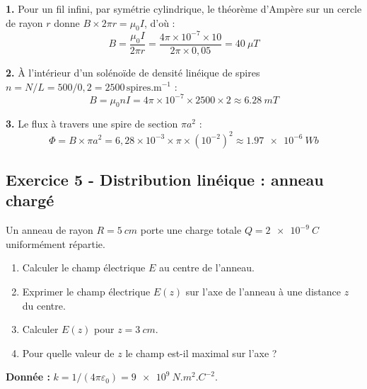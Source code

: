 \documentclass[12pt,a4paper]{article}
\begin{document}
\begin{boitecorrige}
\textbf{1.} Pour un fil infini, par symétrie cylindrique, le théorème d'Ampère sur un cercle de rayon $r$ donne $B\times 2\pi r = \mu_0 I$, d'où :
\[
B = \frac{\mu_0 I}{2\pi r} = \frac{4\pi\times10^{-7}\times10}{2\pi\times0{,}05} = \qty{40}{\mu T}
\]

\begin{center}
\end{center}

\textbf{2.} À l'intérieur d'un solénoïde de densité linéique de spires $n = N/L = 500/0{,}2 = 2500\,\text{spires.m}^{-1}$ :
\[
B = \mu_0 n I = 4\pi\times10^{-7}\times2500\times2 \approx \qty{6.28}{mT}
\]

\textbf{3.} Le flux à travers une spire de section $\pi a^2$ :
\[
\Phi = B\times\pi a^2 = 6{,}28\times10^{-3}\times\pi\times(10^{-2})^2 \approx \qty{1.97e-6}{Wb}
\]
\end{boitecorrige}


\subsection*{Exercice 5 - Distribution linéique : anneau chargé \niveau{\moyen}}

\begin{boiteexercice}
Un anneau de rayon $R = \qty{5}{cm}$ porte une charge totale $Q = \qty{2e-9}{C}$ uniformément répartie.
\begin{enumerate}
  \item Calculer le champ électrique $E$ au centre de l'anneau.
  \item Exprimer le champ électrique $E(z)$ sur l'axe de l'anneau à une distance $z$ du centre.
  \item Calculer $E(z)$ pour $z = \qty{3}{cm}$.
  \item Pour quelle valeur de $z$ le champ est-il maximal sur l'axe ?
\end{enumerate}
\textbf{Donnée :} $k = 1/(4\pi\varepsilon_0) = \qty{9e9}{N.m^2.C^{-2}}$.
\end{boiteexercice}
\end{document}
